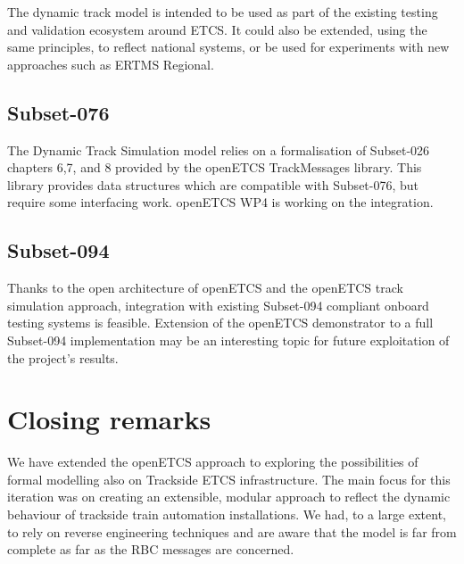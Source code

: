 \documentclass{template/openetcs_article}
\begin{document}
The dynamic track model is intended to be used as part of the existing testing and validation ecosystem around ETCS.
It could also be extended, using the same principles, to reflect national systems, or be used for experiments with new approaches such as ERTMS Regional. 

\subsection{Subset-076}

The Dynamic Track Simulation model relies on a formalisation of Subset-026 chapters 6,7, and 8 provided by the openETCS TrackMessages library. This library provides data structures which are compatible with Subset-076, but require some interfacing work. openETCS WP4 is working on the integration.

\subsection{Subset-094}

Thanks to the open architecture of openETCS and the openETCS track simulation approach, integration with existing Subset-094 compliant onboard testing systems is feasible. 
Extension of the openETCS demonstrator to a full Subset-094 implementation may be an interesting topic for future exploitation of the project's results. 

\section{Closing remarks}

We have extended the openETCS approach to exploring the possibilities of formal modelling also on Trackside ETCS infrastructure. The main focus for this iteration was on creating an extensible, modular approach to reflect the dynamic behaviour of trackside train automation installations.\newline
We had, to a large extent, to rely on reverse engineering techniques and are aware that the model is far from complete as far as the RBC messages are concerned. 





\nocite{*}



\end{document}
